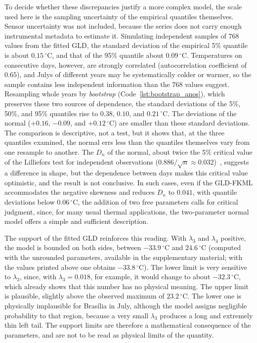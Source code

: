 To decide whether these discrepancies justify a more complex model, the scale used here is the sampling uncertainty of the empirical quantiles themselves. Sensor uncertainty was not included, because the series does not carry enough instrumental metadata to estimate it. Simulating independent samples of $768$ values from the fitted GLD, the standard deviation of the empirical 5\% quantile is about $0.15\,^\circ\text{C}$, and that of the 95\% quantile about $0.09\,^\circ\text{C}$. Temperatures on consecutive days, however, are strongly correlated (autocorrelation coefficient of $0.65$), and Julys of different years may be systematically colder or warmer, so the sample contains less independent information than the $768$ values suggest. Resampling whole years by \textit{bootstrap} (Code~\ref{lst:bootstrap_anos}), which preserves these two sources of dependence, the standard deviations of the 5\%, 50\%, and 95\% quantiles rise to $0.38$, $0.10$, and $0.21\,^\circ\text{C}$. The deviations of the normal ($+0.16$, $-0.09$, and $+0.12\,^\circ\text{C}$) are smaller than these standard deviations. The comparison is descriptive, not a test, but it shows that, at the three quantiles examined, the normal errs less than the quantiles themselves vary from one resample to another. The $D_n$ of the normal, about twice the 5\% critical value of the Lilliefors test for independent observations ($0.886/\sqrt{n} \approx 0.032$)~\cite{lilliefors1967}, suggests a difference in shape, but the dependence between days makes this critical value optimistic, and the result is not conclusive. In such cases, even if the GLD-FKML accommodates the negative skewness and reduces $D_n$ to $0.041$, with quantile deviations below $0.06\,^\circ\text{C}$, the addition of two free parameters calls for critical judgment, since, for many usual thermal applications, the two-parameter normal model offers a simple and sufficient description.



The support of the fitted GLD reinforces this reading. With $\lambda_3$ and $\lambda_4$ positive, the model is bounded on both sides, between $-33.9\,^\circ\text{C}$ and $24.6\,^\circ\text{C}$ (computed with the unrounded parameters, available in the supplementary material; with the values printed above one obtains $-33.8\,^\circ\text{C}$). The lower limit is very sensitive to $\lambda_3$, since, with $\lambda_3 = 0.018$, for example, it would change to about $-32.3\,^\circ\text{C}$, which already shows that this number has no physical meaning. The upper limit is plausible, slightly above the observed maximum of $23.2\,^\circ\text{C}$. The lower one is physically implausible for Brasília in July, although the model assigns negligible probability to that region, because a very small $\lambda_3$ produces a long and extremely thin left tail. The support limits are therefore a mathematical consequence of the parameters, and are not to be read as physical limits of the quantity.

